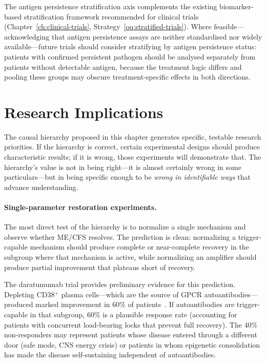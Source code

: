The antigen persistence stratification axis complements the existing biomarker-based stratification framework recommended for clinical trials (Chapter~\ref{ch:clinical-trials}, Strategy~\ref{oq:stratified-trials}). Where feasible---acknowledging that antigen persistence assays are neither standardised nor widely available---future trials should consider stratifying by antigen persistence status: patients with confirmed persistent pathogen should be analysed separately from patients without detectable antigen, because the treatment logic differs and pooling these groups may obscure treatment-specific effects in both directions.



\section{Research Implications}
\label{sec:causal-hierarchy-research}

The causal hierarchy proposed in this chapter generates specific, testable research priorities. If the hierarchy is correct, certain experimental designs should produce characteristic results; if it is wrong, those experiments will demonstrate that. The hierarchy's value is not in being right---it is almost certainly wrong in some particulars---but in being specific enough to be \emph{wrong in identifiable ways} that advance understanding.

\paragraph{Single-parameter restoration experiments.} The most direct test of the hierarchy is to normalize a single mechanism and observe whether ME/CFS resolves. The prediction is clean: normalizing a trigger-capable mechanism should produce complete or near-complete recovery in the subgroup where that mechanism is active, while normalizing an amplifier should produce partial improvement that plateaus short of recovery.

The daratumumab trial provides preliminary evidence for this prediction. Depleting CD38$^+$ plasma cells---which are the source of GPCR autoantibodies---produced marked improvement in 60\% of patients~\cite{Fluge2025daratumumab}. If autoantibodies are trigger-capable in that subgroup, 60\% is a plausible response rate (accounting for patients with concurrent load-bearing locks that prevent full recovery). The 40\% non-responders may represent patients whose disease entered through a different door (safe mode, CNS energy crisis) or patients in whom epigenetic consolidation has made the disease self-sustaining independent of autoantibodies.

